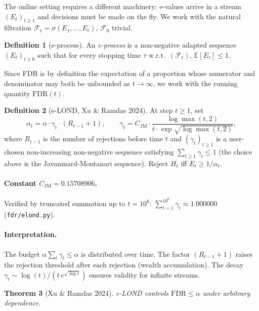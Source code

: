 \documentclass[11pt,a4paper]{article}
\theoremstyle{plain}
\newtheorem{theorem}{Theorem}[section]
\theoremstyle{definition}
\newtheorem{definition}[theorem]{Definition}
\theoremstyle{remark}
\newcommand{\E}{\mathbb{E}}
\newcommand{\FDR}{\mathrm{FDR}}
\begin{document}
The online setting requires a different machinery: e-values arrive in a
stream $(E_t)_{t \ge 1}$ and decisions must be made on the fly. We work with
the natural filtration $\mathcal{F}_t = \sigma(E_1, \ldots, E_t)$,
$\mathcal{F}_0$ trivial.

\begin{definition}[e-process]
An \emph{e-process} is a non-negative adapted sequence $(E_t)_{t \geq 0}$
such that for every stopping time $\tau$ w.r.t.\ $(\mathcal{F}_t)$,
$\E[E_\tau] \leq 1$.
\end{definition}

Since FDR is by definition the expectation of a proportion whose numerator
and denominator may both be unbounded as $t \to \infty$, we work with the
running quantity $\FDR(t)$.

\begin{definition}[e-LOND, Xu \& Ramdas 2024]
At step $t \geq 1$, set
\begin{equation}\label{eq:elond}
  \alpha_t = \alpha \cdot \gamma_t \cdot (R_{t-1} + 1),
  \qquad
  \gamma_t = C_\mathrm{JM} \cdot
    \frac{\log\max(t,2)}{t \cdot \exp\!\sqrt{\log\max(t,2)}},
\end{equation}
where $R_{t-1}$ is the number of rejections before time $t$ and
$(\gamma_t)_{t \geq 1}$ is a user-chosen non-increasing non-negative sequence
satisfying $\sum_{t \geq 1} \gamma_t \leq 1$ (the choice above is the
Javanmard-Montanari sequence). Reject $H_t$ iff $E_t \geq 1/\alpha_t$.
\end{definition}

\paragraph{Constant $C_\mathrm{JM} = 0.15708906$.}
Verified by truncated summation up to $t = 10^6$:
$\sum_{t=1}^{10^6} \gamma_t \approx 1.000000$ (\texttt{fdr/elond.py}).

\paragraph{Interpretation.}
The budget $\alpha \sum_t \gamma_t \leq \alpha$ is distributed over time. The
factor $(R_{t-1}+1)$ raises the rejection threshold after each rejection
(wealth accumulation). The decay $\gamma_t \sim \log(t)/(t\,e^{\sqrt{\log t}})$
ensures validity for infinite streams.

\begin{theorem}[Xu \& Ramdas 2024]
e-LOND controls $\FDR \le \alpha$ under arbitrary dependence.
\end{theorem}
\end{document}
